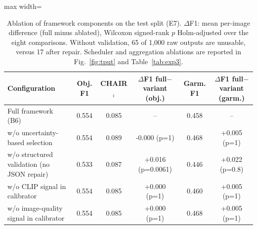 \begin{table}[!t]
\centering
\footnotesize
\caption{Ablation of framework components on the test split (E7). $\Delta$F1: mean per-image difference (full minus ablated), Wilcoxon signed-rank $p$ Holm-adjusted over the eight comparisons. Without validation, 65 of 1,000 raw outputs are unusable, versus 17 after repair. Scheduler and aggregation ablations are reported in Fig.~\ref{fig:tput} and Table~\ref{tab:exp3}.}
\label{tab:ablation}
\begin{adjustbox}{max width=\textwidth}
\begin{tabular}{lccccc}
\toprule
Configuration & Obj. F1 & CHAIR$_i$ & $\Delta$F1 full$-$variant (obj.) & Garm. F1 & $\Delta$F1 full$-$variant (garm.) \\
\midrule
Full framework (B6) & 0.554 & 0.085 & -- & 0.458 & -- \\
w/o uncertainty-based selection & 0.554 & 0.089 & -0.000 (p=1) & 0.468 & +0.005 (p=1) \\
w/o structured validation (no JSON repair) & 0.533 & 0.087 & +0.016 (p=0.0061) & 0.446 & +0.022 (p=0.8) \\
w/o CLIP signal in calibrator & 0.554 & 0.085 & +0.000 (p=1) & 0.460 & +0.005 (p=1) \\
w/o image-quality signal in calibrator & 0.554 & 0.085 & +0.000 (p=1) & 0.468 & +0.005 (p=1) \\
\bottomrule
\end{tabular}
\end{adjustbox}
\end{table}
